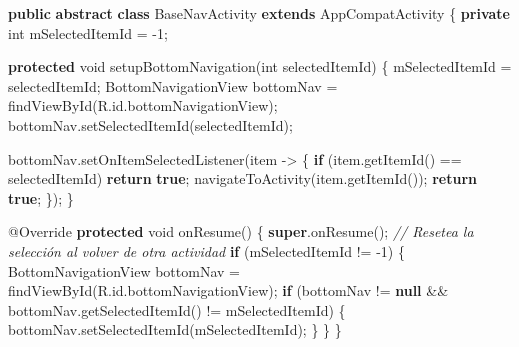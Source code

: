 \documentclass[
  spanish,
  11pt,
  paper=a4,
  ,captions=tableheading
]{scrartcl}
\newenvironment{Shaded}{}{}
\newcommand{\AttributeTok}[1]{\textcolor[rgb]{0.49,0.56,0.16}{#1}}
\newcommand{\CommentTok}[1]{\textcolor[rgb]{0.38,0.63,0.69}{\textit{#1}}}
\newcommand{\ControlFlowTok}[1]{\textcolor[rgb]{0.00,0.44,0.13}{\textbf{#1}}}
\newcommand{\DataTypeTok}[1]{\textcolor[rgb]{0.56,0.13,0.00}{#1}}
\newcommand{\DecValTok}[1]{\textcolor[rgb]{0.25,0.63,0.44}{#1}}
\newcommand{\FunctionTok}[1]{\textcolor[rgb]{0.02,0.16,0.49}{#1}}
\newcommand{\KeywordTok}[1]{\textcolor[rgb]{0.00,0.44,0.13}{\textbf{#1}}}
\newcommand{\NormalTok}[1]{#1}
\newcommand{\OperatorTok}[1]{\textcolor[rgb]{0.40,0.40,0.40}{#1}}
\begin{document}
\begin{Shaded}
\begin{Highlighting}[]
\KeywordTok{public} \KeywordTok{abstract} \KeywordTok{class}\NormalTok{ BaseNavActivity }\KeywordTok{extends}\NormalTok{ AppCompatActivity }\OperatorTok{\{}
    \KeywordTok{private} \DataTypeTok{int}\NormalTok{ mSelectedItemId }\OperatorTok{=} \OperatorTok{{-}}\DecValTok{1}\OperatorTok{;}

    \KeywordTok{protected} \DataTypeTok{void} \FunctionTok{setupBottomNavigation}\OperatorTok{(}\DataTypeTok{int}\NormalTok{ selectedItemId}\OperatorTok{)} \OperatorTok{\{}
\NormalTok{        mSelectedItemId }\OperatorTok{=}\NormalTok{ selectedItemId}\OperatorTok{;}
\NormalTok{        BottomNavigationView bottomNav }\OperatorTok{=} \FunctionTok{findViewById}\OperatorTok{(}\NormalTok{R}\OperatorTok{.}\FunctionTok{id}\OperatorTok{.}\FunctionTok{bottomNavigationView}\OperatorTok{);}
\NormalTok{        bottomNav}\OperatorTok{.}\FunctionTok{setSelectedItemId}\OperatorTok{(}\NormalTok{selectedItemId}\OperatorTok{);}

\NormalTok{        bottomNav}\OperatorTok{.}\FunctionTok{setOnItemSelectedListener}\OperatorTok{(}\NormalTok{item }\OperatorTok{{-}\textgreater{}} \OperatorTok{\{}
            \ControlFlowTok{if} \OperatorTok{(}\NormalTok{item}\OperatorTok{.}\FunctionTok{getItemId}\OperatorTok{()} \OperatorTok{==}\NormalTok{ selectedItemId}\OperatorTok{)} \ControlFlowTok{return} \KeywordTok{true}\OperatorTok{;}
            \FunctionTok{navigateToActivity}\OperatorTok{(}\NormalTok{item}\OperatorTok{.}\FunctionTok{getItemId}\OperatorTok{());}
            \ControlFlowTok{return} \KeywordTok{true}\OperatorTok{;}
        \OperatorTok{\});}
    \OperatorTok{\}}

    \AttributeTok{@Override}
    \KeywordTok{protected} \DataTypeTok{void} \FunctionTok{onResume}\OperatorTok{()} \OperatorTok{\{}
        \KeywordTok{super}\OperatorTok{.}\FunctionTok{onResume}\OperatorTok{();}
        \CommentTok{// Resetea la selección al volver de otra actividad}
        \ControlFlowTok{if} \OperatorTok{(}\NormalTok{mSelectedItemId }\OperatorTok{!=} \OperatorTok{{-}}\DecValTok{1}\OperatorTok{)} \OperatorTok{\{}
\NormalTok{            BottomNavigationView bottomNav }\OperatorTok{=} \FunctionTok{findViewById}\OperatorTok{(}\NormalTok{R}\OperatorTok{.}\FunctionTok{id}\OperatorTok{.}\FunctionTok{bottomNavigationView}\OperatorTok{);}
            \ControlFlowTok{if} \OperatorTok{(}\NormalTok{bottomNav }\OperatorTok{!=} \KeywordTok{null} \OperatorTok{\&\&}\NormalTok{ bottomNav}\OperatorTok{.}\FunctionTok{getSelectedItemId}\OperatorTok{()} \OperatorTok{!=}\NormalTok{ mSelectedItemId}\OperatorTok{)} \OperatorTok{\{}
\NormalTok{                bottomNav}\OperatorTok{.}\FunctionTok{setSelectedItemId}\OperatorTok{(}\NormalTok{mSelectedItemId}\OperatorTok{);}
            \OperatorTok{\}}
        \OperatorTok{\}}
    \OperatorTok{\}}


\end{Highlighting}
\end{Shaded}
\end{document}

